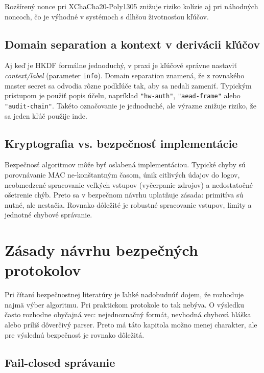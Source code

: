 \documentclass[journal,a4paper,onecolumn]{IEEEtran}
\begin{document}
Rozšírený nonce pri XChaCha20-Poly1305 znižuje riziko kolízie aj pri náhodných noncoch, čo je výhodné v systémoch s dlhšou životnosťou kľúčov.\cite{LibsodiumXChaChaDoc}

\subsection{Domain separation a kontext v derivácii kľúčov}

Aj keď je HKDF formálne jednoduchý, v praxi je kľúčové správne nastaviť \emph{context/label} (parameter \texttt{info}). Domain separation znamená, že z rovnakého master secret sa odvodia rôzne podkľúče tak, aby sa nedali zameniť. Typickým prístupom je použiť popis účelu, napríklad \texttt{"hw-auth"}, \texttt{"aead-frame"} alebo \texttt{"audit-chain"}. Takéto označovanie je jednoduché, ale výrazne znižuje riziko, že sa jeden kľúč  použije inde.

\subsection{Kryptografia vs. bezpečnosť implementácie}

Bezpečnosť algoritmov môže byť oslabená implementáciou. Typické chyby sú porovnávanie MAC ne-konštantným časom, únik citlivých údajov do logov, neobmedzené spracovanie veľkých vstupov (vyčerpanie zdrojov) a nedostatočné ošetrenie chýb. Preto sa v bezpečnom návrhu uplatňuje zásada: primitíva sú nutné, ale nestačia. Rovnako dôležité je robustné spracovanie vstupov, limity a jednotné chybové správanie.



\section{Zásady návrhu bezpečných protokolov}

Pri čítaní bezpečnostnej literatúry je ľahké nadobudnúť dojem, že rozhoduje najmä výber algoritmu. Pri praktickom protokole to tak nebýva. O výsledku často rozhodne obyčajná vec: nejednoznačný formát, nevhodná chybová hláška alebo príliš dôverčivý parser. Preto má táto kapitola možno menej  charakter, ale pre výslednú bezpečnosť je rovnako dôležitá.

\subsection{Fail-closed správanie}
\end{document}

